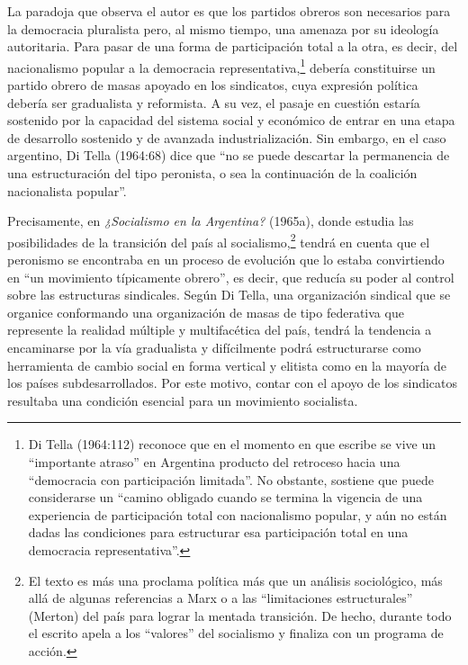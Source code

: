 La paradoja que observa el autor es que los partidos obreros son necesarios para la democracia pluralista pero, al mismo tiempo, una amenaza por su ideología autoritaria. Para pasar de una forma de participación total a la otra, es decir, del nacionalismo popular a la democracia representativa,\footnote{Di Tella (1964:112) reconoce que en el momento en que escribe se vive un \enquote{importante atraso} en Argentina producto del retroceso hacia una \enquote{democracia con participación limitada}. No obstante, sostiene que puede considerarse un \enquote{camino obligado cuando se termina la vigencia de una experiencia de participación total con nacionalismo popular, y aún no están dadas las condiciones para estructurar esa participación total en una democracia representativa}.} debería constituirse un partido obrero de masas apoyado en los sindicatos, cuya expresión política debería ser gradualista y reformista. A su vez, el pasaje en cuestión estaría sostenido por la capacidad del sistema social y económico de entrar en una etapa de desarrollo sostenido y de avanzada industrialización. Sin embargo, en el caso argentino, Di Tella (1964:68) dice que \enquote{no se puede descartar la permanencia de una estructuración del tipo peronista, o sea la continuación de la coalición nacionalista popular}.

Precisamente, en \emph{¿Socialismo en la Argentina?} (1965a), donde estudia las posibilidades de la transición del país al socialismo,\footnote{El texto es más una proclama política más que un análisis sociológico, más allá de algunas referencias a Marx o a las \enquote{limitaciones estructurales} (Merton) del país para lograr la mentada transición. De hecho, durante todo el escrito apela a los \enquote{valores} del socialismo y finaliza con un programa de acción.} tendrá en cuenta que el peronismo se encontraba en un proceso de evolución que lo estaba convirtiendo en \enquote{un movimiento típicamente obrero}, es decir, que reducía su poder al control sobre las estructuras sindicales. Según Di Tella, una organización sindical que se organice conformando una organización de masas de tipo federativa que represente la realidad múltiple y multifacética del país, tendrá la tendencia a encaminarse por la vía gradualista y difícilmente podrá estructurarse como herramienta de cambio social en forma vertical y elitista como en la mayoría de los países subdesarrollados. Por este motivo, contar con el apoyo de los sindicatos resultaba una condición esencial para un movimiento socialista.

